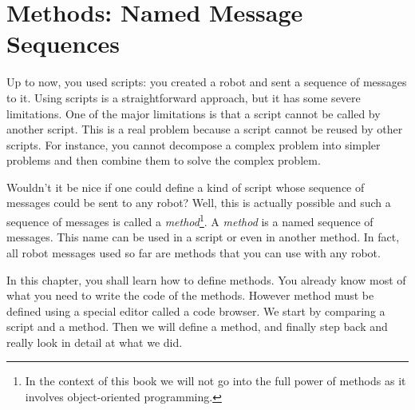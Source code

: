 \ifx\wholebook\relax\else



\fi
\chapter{Methods: Named Message Sequences}\label{ch:turtleTeaching}\label{ch:abstraction}\label{cha:enseigner}




Up to now, you used scripts: you created \newcommand{\remove}[1]{first} a robot and sent a sequence of 
messages to it. Using scripts is a straightforward approach, but it has some 
severe limitations. One of the major \newcommand{\replace}[2]{limitation}{limitations} is that a script cannot be called by another script. This is a real problem because a script cannot be reused by other scripts. \newcommand{\replace}[2]{Moreover}{For instance,} you cannot decompose a complex problem into simpler problems \newcommand{\add}[1]{that you solve with separate scripts,} and then \newcommand{\replace}[2]{recompose}{combine} them to solve the complex problem.

Wouldn't it be nice if one could define a kind of script whose sequence of messages could be sent to any robot\newcommand{\replace}[2]{.}{?} Well, this is \newcommand{\replace}[2]{of course}{actually} possible\newcommand{\add}[1]{,} and such a sequence of messages is called a \emph{method}\footnote{In the context of this book we will not \newcommand{\replace}[2]{elaborate on}{go into} the \newcommand{\replace}[2]{real}{full} power of methods\newcommand{\add}[1]{,} as \newcommand{\replace}[2]{this has to do with}{it involves} 
object-oriented programming.}. A \emph{method} is a named sequence of messages. This name can be used in a script or even in another method.  In fact, all \newcommand{\add}[1]{the} robot messages \newcommand{\add}[1]{you have} used so far are methods that you \newcommand{\replace}[2]{used on}{can use with} any robot. 

In this chapter, you shall learn how to define methods. You already know most of \newcommand{\replace}[2]{the things needed}{what you need} to write the code of the methods. However \newcommand{\add}[1]{a} method must be defined using  a special editor called   a code browser. We start by comparing a script and a method. Then we will define a method\newcommand{\replace}[2]{ then}{, and} finally step back and really look in detail at what we did.


